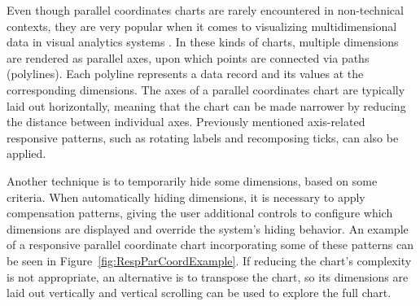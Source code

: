 

Even though parallel coordinates charts are rarely encountered in
non-technical contexts, they are very popular when it comes to
visualizing multidimensional data in visual analytics systems
\parencite{HighD}. In these kinds of charts, multiple dimensions are
rendered as parallel axes, upon which points are connected via paths
(polylines). Each polyline represents a data record and its values at
the corresponding dimensions. The axes of a parallel coordinates chart
are typically laid out horizontally, meaning that the chart can be
made narrower by reducing the distance between individual axes.
Previously mentioned axis-related responsive patterns, such as
rotating labels and recomposing ticks, can also be applied.

Another technique is to temporarily hide some dimensions, based on
some criteria. When automatically hiding dimensions, it is necessary
to apply compensation patterns, giving the user additional controls to
configure which dimensions are displayed and override the system's
hiding behavior. An example of a responsive parallel coordinate chart
incorporating some of these patterns can be seen in
Figure~\ref{fig:RespParCoordExample}.
%
If reducing the chart's complexity is not appropriate, an alternative
is to transpose the chart, so its dimensions are laid out vertically
and vertical scrolling can be used to explore the full chart.




